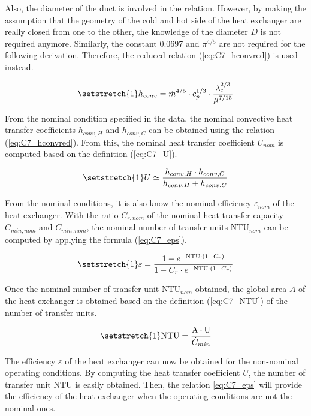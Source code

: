 Also, the diameter of the duct is involved in the relation. However, by making the assumption that the geometry of the cold and hot side of the heat exchanger are really closed from one to the other, the knowledge of the diameter $D$ is not required anymore. Similarly, the constant 0.0697 and $\pi^{4/5}$ are not required for the following derivation. Therefore, the reduced relation (\ref{eq:C7_hconvred}) is used instead.


\begin{equation}
    \setstretch{1}
    h_{conv} = \dot{m}^{4/5}\cdot c_p^{1/3}\cdot \frac{\lambda_c^{2/3}}{\mu^{7/15}}\label{eq:C7_hconvred}
\end{equation}

From the nominal condition specified in the data, the nominal convective heat transfer coefficients $h_{conv,H}$ and $h_{conv,C}$ can be obtained using the relation (\ref{eq:C7_hconvred}). From this, the nominal heat transfer coefficient $U_{nom}$ is computed based on the definition (\ref{eq:C7_U}).

\begin{equation}
    \setstretch{1}
    U \simeq \frac{h_{conv,H}\cdot h_{conv,C}}{h_{conv,H} + h_{conv,C}}\label{eq:C7_U}
\end{equation}

From the nominal conditions, it is also know the nominal efficiency $\varepsilon_{nom}$ of the heat exchanger. With the ratio $C_{r,nom}$ of the nominal heat transfer capacity $\dot{C}_{min,nom}$ and $\dot{C}_{min,nom}$, the nominal number of transfer units NTU$_{nom}$ can be computed by applying the formula (\ref{eq:C7_eps}).

\begin{align}
    \setstretch{1}
    \varepsilon = \frac{1 - e^{-\text{NTU}\cdot (1 - C_r)}}{1 - C_r\cdot e^{-\text{NTU}\cdot (1 - C_r)}}\label{eq:C7_eps}
\end{align}

Once the nominal number of transfer unit NTU$_{nom}$ obtained, the global area $A$ of the heat exchanger is obtained based on the definition (\ref{eq:C7_NTU}) of the number of transfer units.

\begin{equation}
    \setstretch{1}
    \text{NTU} = \frac{\mathrm{A}\cdot \mathrm{U}}{\dot{C}_{min}} \label{eq:C7_NTU}
\end{equation}

The efficiency $\varepsilon$ of the heat exchanger can now be obtained for the non-nominal operating conditions. By computing the heat transfer coefficient $U$, the number of transfer unit NTU is easily obtained. Then, the relation \ref{eq:C7_eps} will provide the efficiency of the heat exchanger when the operating conditions are not the nominal ones.

